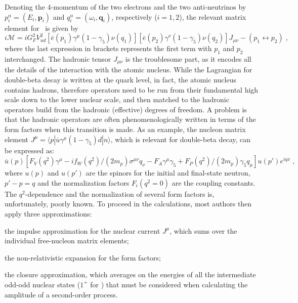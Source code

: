 Denoting the 4-momentum of the two electrons and the two anti-neutrinos by $p^\alpha_i =
(E_i,\mathbf{p}_i)$ and $q^\alpha_i = (\omega_i,\mathbf{q}_i)$, respectively ($i=1,2$),
the relevant matrix element for \nnbb\ is given by
\[
  i\mathcal{M} = iG^2_F V^2_{ud}
                 [\overline{e}(p_1) \gamma^\mu (1-\gamma_5) \nu(q_1)]
                 [\overline{e}(p_2) \gamma^\nu (1-\gamma_5) \nu(q_2)]
                 J_{\mu\nu} - (p_1\leftrightarrow p_2) \;,
\]
where the last expression in brackets represents the first term with $p_1$ and $p_2$
interchanged. The hadronic tensor $J_{\mu\nu}$ is the troublesome part, as it encodes all
the details of the interaction with the atomic nucleus. While the Lagrangian for
double-beta decay is written at the quark level, in fact, the atomic nucleus contains
hadrons, therefore operators need to be run from their fundamental high scale down to the
lower nuclear scale, and then matched to the hadronic operators build from the hadronic
(effective) degrees of freedom. A problem is that the hadronic operators are often
phenomenologically written in terms of the form factors when this transition is made. As
an example, the nucleon matrix element $J^\mu = \langle{p}| \overline{u} \gamma^\mu
(1-\gamma_5) d |{n}\rangle$, which is relevant for double-beta decay, can be expressed as:
\[
  \overline{u}(p) \left[
    F_V(q^2)\gamma^\mu
    - if_W(q^2)/(2m_p) \sigma^{\mu\nu} q_\nu
    - F_A\gamma^\mu\gamma_5
    + F_P(q^2)/(2m_p)\gamma_5q_\mu
  \right] u(p')e^{iqx} \;,
\]
where $u(p)$ and $u(p')$ are the spinors for the initial and final-state neutron, $p'-p=q$
and the normalization factors $F_i(q^2=0)$ are the coupling constants. The
$q^2$-dependence and the normalization of several form factors is, unfortunately, poorly
known.  To proceed in the calculations, most authors then apply three approximations:
\begin{inparaenum}[\itshape a)]
  \item the impulse approximation for the nuclear current $J^\mu$, which sums over the
    individual free-nucleon matrix elements;
  \item the non-relativistic expansion for the form factors;
  \item the closure approximation, which averages on the energies of all the intermediate
    odd-odd nuclear states ($1^+$ for \nnbb) that must be considered when calculating the
    amplitude of a second-order process. 
\end{inparaenum}
